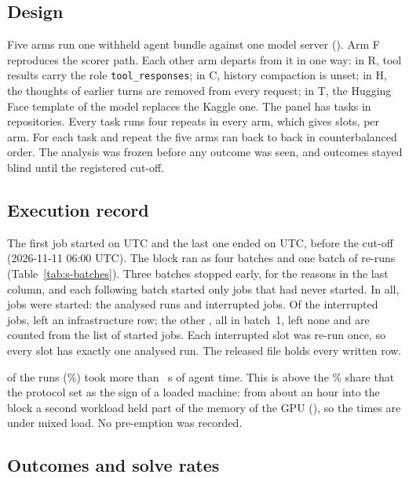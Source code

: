 \subsection{Design}

Five arms run one withheld agent bundle against one model server (). Arm F reproduces the scorer path.
Each other arm departs from it in one way: in R, tool results carry the role \texttt{tool\_responses}; in C, history
compaction is unset; in H, the thoughts of earlier turns are removed from every request; in T, the Hugging Face
template of the model replaces the Kaggle one. The panel has \STasks{} tasks in \SRepos{} repositories. Every task runs
four repeats in every arm, which gives \SSlots{} slots, \SRunsPerArm{} per arm. For each task and repeat the five arms
ran back to back in counterbalanced order. The analysis was frozen before any outcome was seen, and outcomes stayed
blind until the registered cut-off.

\subsection{Execution record}

The first job started on \SFirstStart{} UTC and the last one ended on \SLastEnd{} UTC, before the cut-off
(2026-11-11 06:00 UTC). The block ran as four batches and one batch of re-runs (Table~\ref{tab:s-batches}). Three
batches stopped early, for the reasons in the last column, and each following batch started only jobs that had never
started. In all, \SJobsStarted{} jobs were started: the \SAgentRows{} analysed runs and \SInfraRowsAll{} interrupted
jobs. Of the interrupted jobs, \SInfraRowsWritten{} left an infrastructure row; the other \SInfraNoRow{}, all in
batch~1, left none and are counted from the list of started jobs. Each interrupted slot was re-run once, so every slot
has exactly one analysed run. The released file holds every written row.



\SLoadAbove{} of the \SLoadRows{} runs (\SLoadShare\%) took more than \SLoadThreshold{}~s of agent time. This is above
the \SLoadFlag\% share that the protocol set as the sign of a loaded machine: from about an hour into the block a
second workload held part of the memory of the GPU (), so the times are under mixed load. No pre-emption
was recorded.

\subsection{Outcomes and solve rates}

